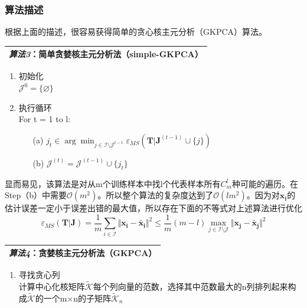 \documentclass[10pt,a4paper]{article}
\begin{document}
\begin{CJK*}{UTF8}{song}
\subsubsection{算法描述}
根据上面的描述，很容易获得简单的贪心核主元分析（GKPCA）算法。
\begin{table}[!htp]
\label{notation}
\center
\begin{tabular}{|L{0.9\textwidth}|}
\hline
\textit{算法3}：简单贪婪核主元分析法（simple-GKPCA） \\
\hline
\end{tabular}
\end{table}
\begin{enumerate}
\item 初始化\\
$\mathcal{J}^{0}=\{\varnothing\}$
\item 执行循环\\
For t = 1 to l:
\begin{enumerate}
 \item[(a)] 
 $
 j_t \in \arg\min_{j \in \mathcal{I}\setminus\mathcal{J}^{t-1}}
 \varepsilon_{MS}(\boldsymbol{T}|\boldsymbol{J}^{(t-1)} \cup \{j\})
 $
 \item[(b)] 
 $
 \mathcal{J}^{(t)}=\mathcal{J}^{(t-1)} \cup \{ j_t\}
 $
\end{enumerate} 
\end{enumerate}
显而易见，该算法是对从m个训练样本中找l个代表样本所有$C_m^l$种可能的遍历。在Step（b）中需要$\mathcal{O}(m^2)$。所以整个算法的复杂度达到了$\mathcal{O}(lm^2)$。因为对$\boldsymbol{x_i}$的估计误差一定小于误差出错的最大值，所以存在下面的不等式对上述算法进行优化
\begin{equation}
\varepsilon_{MS}(\boldsymbol{T}|\boldsymbol{J})
=\frac{1}{m}\sum_{i \in \mathcal{I}}\Vert \boldsymbol{x_i}-\tilde{\boldsymbol{x_i}} \Vert^2
\leqslant \frac{1}{m}(m-l)\max_{j \in \mathcal{I} \setminus \mathcal{J}} \Vert \boldsymbol{x_j}-\tilde{\boldsymbol{x_j}} \Vert^2
\end{equation}
\begin{table}[!htp]
\label{notation}
\center
\begin{tabular}{|L{0.9\textwidth}|}
\hline
\textit{算法4}：贪婪核主元分析法（GKPCA）\cite{9} \\
\hline
\end{tabular}
\end{table}
\begin{enumerate}
\item 寻找贪心列\\
计算中心化核矩阵$\tilde{\mathcal{K}}$每个列向量的范数，选择其中范数最大的n列排列起来构成$\tilde{\mathcal{K}}$的一个m×n的子矩阵$\tilde{\mathcal{K}}_n$

\end{enumerate}
\end{CJK*}
\end{document}
